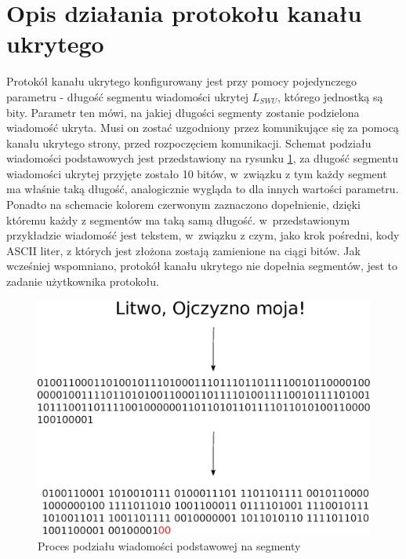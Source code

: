 \documentclass[a4paper, twoside, 12pt]{report}
\begin{document}
    \section{Opis działania protokołu kanału ukrytego}
    Protokół kanału ukrytego konfigurowany jest przy pomocy pojedynczego parametru -
    długość segmentu wiadomości ukrytej \( L_{SWU} \), którego jednostką są bity.
    Parametr ten mówi, na jakiej długości segmenty zostanie podzielona wiadomość
    ukryta. Musi on zostać uzgodniony przez komunikujące się za pomocą kanału
    ukrytego strony, przed rozpoczęciem komunikacji. Schemat podziału wiadomości
    podstawowych jest przedstawiony na rysunku \ref{SEGMENTATION}, za długość
    segmentu wiadomości ukrytej przyjęte zostało 10 bitów, w~związku z tym każdy segment
    ma właśnie taką długość, analogicznie wygląda to dla innych wartości parametru.
    Ponadto na schemacie kolorem czerwonym zaznaczono dopełnienie, dzięki któremu
    każdy z segmentów ma taką samą długość.  w~przedstawionym przykładzie wiadomość
    jest tekstem, w~związku z czym, jako krok pośredni, kody ASCII liter, z których
    jest złożona zostają zamienione na ciągi bitów. Jak wcześniej wspomniano, protokół
    kanału ukrytego nie dopełnia segmentów, jest to zadanie użytkownika protokołu.
        \begin{figure}[h]
                \centering
                \includegraphics[scale=0.8]{podzial_na_segmenty}
                \caption{Proces podziału wiadomości podstawowej na segmenty}
                \label{SEGMENTATION}
        \end{figure}
\end{document}
